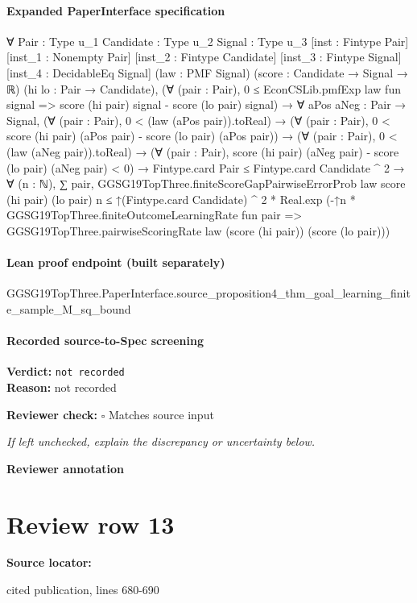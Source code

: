 \documentclass[10pt]{article}
\newcommand{\reviewerbox}{%
  \par\noindent\fbox{\parbox{0.96\linewidth}{\rule{0pt}{0.38in}}}\par
}
\newcommand{\reviewmatch}[1]{%
  \par\noindent\textbf{Reviewer check:} $\square$\; #1\par
  \noindent\emph{If left unchecked, explain the discrepancy or uncertainty below.}\par
}
\begin{document}
\paragraph{Expanded PaperInterface specification}
\begin{ReviewVerbatim}
∀ {Pair : Type u_1} {Candidate : Type u_2} {Signal : Type u_3} [inst : Fintype Pair] [inst_1 : Nonempty Pair]
  [inst_2 : Fintype Candidate] [inst_3 : Fintype Signal] [inst_4 : DecidableEq Signal] (law : PMF Signal)
  (score : Candidate → Signal → ℝ) (hi lo : Pair → Candidate),
  (∀ (pair : Pair), 0 ≤ EconCSLib.pmfExp law fun signal => score (hi pair) signal - score (lo pair) signal) →
    ∀ {aPos aNeg : Pair → Signal},
      (∀ (pair : Pair), 0 < (law (aPos pair)).toReal) →
        (∀ (pair : Pair), 0 < score (hi pair) (aPos pair) - score (lo pair) (aPos pair)) →
          (∀ (pair : Pair), 0 < (law (aNeg pair)).toReal) →
            (∀ (pair : Pair), score (hi pair) (aNeg pair) - score (lo pair) (aNeg pair) < 0) →
              Fintype.card Pair ≤ Fintype.card Candidate ^ 2 →
                ∀ (n : ℕ),
                  ∑ pair, GGSG19TopThree.finiteScoreGapPairwiseErrorProb law score (hi pair) (lo pair) n ≤
                    ↑(Fintype.card Candidate) ^ 2 *
                      Real.exp
                        (-↑n *
                          GGSG19TopThree.finiteOutcomeLearningRate fun pair =>
                            GGSG19TopThree.pairwiseScoringRate law (score (hi pair)) (score (lo pair)))
\end{ReviewVerbatim}

\paragraph{Lean proof endpoint (built separately)}\begin{ReviewVerbatim}
GGSG19TopThree.PaperInterface.source_proposition4_thm_goal_learning_finite_sample_M_sq_bound
\end{ReviewVerbatim}

\paragraph{Recorded source-to-Spec screening}
\textbf{Verdict:} \texttt{not recorded}
\\
\textbf{Reason:} not recorded
\reviewmatch{Matches source input}
\noindent\textbf{Reviewer annotation}\par
\reviewerbox
\clearpage
\hypertarget{source-claim-f4c362962779355c}{}
\section*{Review row 13}
\textbf{Source locator:} {\footnotesize\raggedright cited publication, lines 680-\allowbreak{}690\par}
\end{document}
